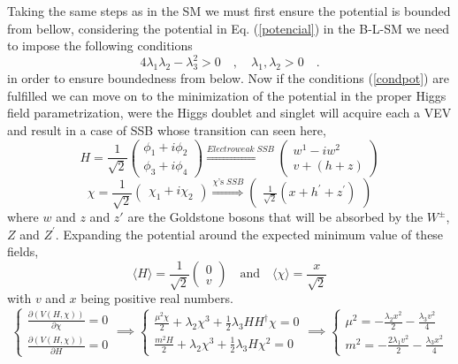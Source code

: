 \documentclass[12pt]{article}
\begin{document}
Taking the same steps as in the SM we must first ensure the potential is bounded from bellow, considering the potential in Eq. (\ref{potencial}) in the B-L-SM we need to impose the following conditions
%
\begin{equation}
4 \lambda_1 \lambda_2  -  \lambda_3^2 > 0 \quad , \quad \lambda_1 , \lambda_2>0 \quad . 
\label{condpot}
\end{equation}
%
in order to ensure boundedness from below. Now if the conditions (\ref{condpot}) are fulfilled we can move on to the minimization of the potential in the proper Higgs field parametrization, were the Higgs doublet and singlet will acquire each a VEV and result in a case of SSB whose transition can seen here,
%
\begin{equation}
H= \frac{1}{\sqrt{2}}
\begin{pmatrix}
\phi_1  + i \phi_2 \\
\phi_3  + i \phi_4
\end{pmatrix} 
\overset{Electroweak \; SSB}{\Rightarrow}
\begin{pmatrix}
w^1 - i w^2  \\
v+(h+z)
\end{pmatrix}
\end{equation} 
%
\begin{equation}
\chi=\frac{1}{\sqrt{2}} \begin{pmatrix} \chi_1 + i \chi_2 \end{pmatrix}
\overset{ \chi\text{'s} \; SSB}{\Rightarrow}
\begin{pmatrix}
\frac{1}{\sqrt{2}}(x+h^\prime+z^\prime)
\end{pmatrix}
\end{equation}
%
where $w$ and $z$ and $z'$ are the Goldstone bosons that will be absorbed by the $W^\pm$, $Z$ and $Z^\prime$. Expanding the potential around the expected minimum value of these fields, 
%
\begin{equation}
\langle H \rangle = \frac{1}{\sqrt{2}} \begin{pmatrix}
0 \\ 
v
\end{pmatrix} \quad \text{and} \quad 
\langle \chi \rangle  = \frac{x}{\sqrt{2}}
\end{equation}
%
with $v$ and $x$ being positive real numbers.
\begin{equation}
 \begin{cases} \frac{\partial ( V(H,\chi))}{\partial \chi} = 0 \\ \frac{\partial (V(H,\chi))}{\partial H}=0 \end{cases}  \implies  \begin{cases}  \frac{\mu^2 \chi}{2} +  \lambda_2 \chi^3 +  \frac{1}{2} \lambda_3 H H^\dagger \chi = 0 \\  \frac{m^2 H}{2} +  \lambda_2 \chi^3 +   \frac{1}{2} \lambda_3 H \chi^2 =0 \end{cases}  \implies \begin{cases}  \mu^2 = - \frac{\lambda_2 x^2}{2} - \frac{\lambda_3 v^2}{4}  \\ m^2 =  -\frac{ 2\lambda_1 v^2}{2} - \frac{\lambda_3 x^2 }{4} \end{cases} 
 \label{minipro}
\end{equation}
\end{document}
